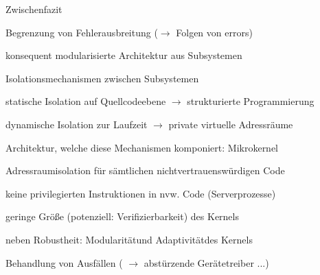 \documentclass[a4paper]{article}
\newcommand{\cmark}{\ding{51}}
\newcommand{\xmark}{\ding{55}}
\begin{document}
\begin{multicols}{3}

    Zwischenfazit
    \begin{itemize*}
        \item Begrenzung von Fehlerausbreitung ($\rightarrow$ Folgen von errors)
        \item konsequent modularisierte Architektur aus Subsystemen
        \item Isolationsmechanismen zwischen Subsystemen
        \item statische Isolation auf Quellcodeebene $\rightarrow$ strukturierte Programmierung
        \item dynamische Isolation zur Laufzeit $\rightarrow$ private virtuelle Adressräume
        \item Architektur, welche diese Mechanismen komponiert: Mikrokernel
        \item[\cmark] Adressraumisolation für sämtlichen nichtvertrauenswürdigen Code
        \item[\cmark] keine privilegierten Instruktionen in nvw. Code (Serverprozesse)
        \item[\cmark] geringe Größe (potenziell: Verifizierbarkeit) des Kernels
        \item[\cmark] neben Robustheit: Modularitätund Adaptivitätdes Kernels
        \item[\xmark] Behandlung von Ausfällen ( $\rightarrow$ abstürzende Gerätetreiber ...)
    \end{itemize*}


\end{multicols}
\end{document}
